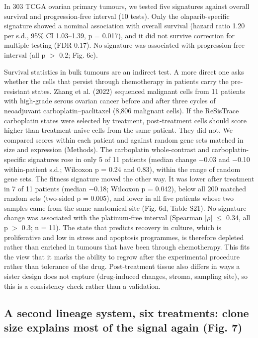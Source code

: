 \documentclass[11pt,a4paper]{article}
\begin{document}
In 303 TCGA ovarian primary tumours, we tested five signatures against overall survival and progression-free interval (10 tests). Only the olaparib-specific signature showed a nominal association with overall survival (hazard ratio 1.20 per s.d., 95\% CI 1.03--1.39, p = 0.017), and it did not survive correction for multiple testing (FDR 0.17). No signature was associated with progression-free interval (all p $>$ 0.2; Fig. 6c).

Survival statistics in bulk tumours are an indirect test. A more direct one asks whether the cells that persist through chemotherapy in patients carry the pre-resistant states. Zhang et al. (2022) sequenced malignant cells from 11 patients with high-grade serous ovarian cancer before and after three cycles of neoadjuvant carboplatin--paclitaxel (8,806 malignant cells). If the ReSisTrace carboplatin states were selected by treatment, post-treatment cells should score higher than treatment-naive cells from the same patient. They did not. We compared scores within each patient and against random gene sets matched in size and expression (Methods). The carboplatin whole-contrast and carboplatin-specific signatures rose in only 5 of 11 patients (median change $-$0.03 and $-$0.10 within-patient s.d.; Wilcoxon p = 0.24 and 0.83), within the range of random gene sets. The fitness signature moved the other way. It was lower after treatment in 7 of 11 patients (median $-$0.18; Wilcoxon p = 0.042), below all 200 matched random sets (two-sided p = 0.005), and lower in all five patients whose two samples came from the same anatomical site (Fig. 6d, Table S21). No signature change was associated with the platinum-free interval (Spearman |$\rho$| $\leq$ 0.34, all p $>$ 0.3; n = 11). The state that predicts recovery in culture, which is proliferative and low in stress and apoptosis programmes, is therefore depleted rather than enriched in tumours that have been through chemotherapy. This fits the view that it marks the ability to regrow after the experimental procedure rather than tolerance of the drug. Post-treatment tissue also differs in ways a sister design does not capture (drug-induced changes, stroma, sampling site), so this is a consistency check rather than a validation.

\subsection*{A second lineage system, six treatments: clone size explains most of the signal again (Fig. 7)}
\end{document}
